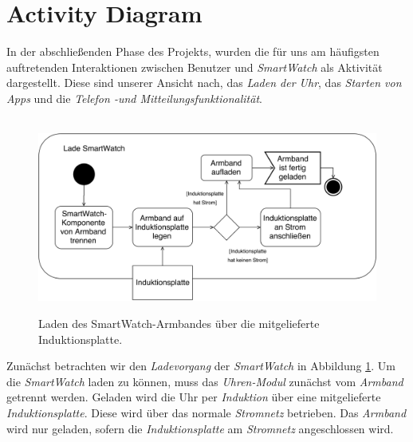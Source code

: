\section{Activity Diagram}
In der abschließenden Phase des Projekts, wurden die für uns am häufigsten auftretenden Interaktionen zwischen Benutzer und \textit{SmartWatch} als Aktivität dargestellt. Diese sind unserer Ansicht nach, das \textit{Laden der Uhr}, das \textit{Starten von Apps} und die \textit{Telefon -und Mitteilungsfunktionalität}.\\
\begin{figure}[h]
\centering\
\includegraphics[width=\textwidth]{img/activityLaden}
\caption{Laden des SmartWatch-Armbandes über die mitgelieferte Induktionsplatte.}\label{fig:activityLaden}
\end{figure}
Zunächst betrachten wir den \textit{Ladevorgang} der \textit{SmartWatch} in Abbildung \ref{fig:activityLaden}.
Um die \textit{SmartWatch} laden zu können, muss das \textit{Uhren-Modul} zunächst vom \textit{Armband} getrennt werden. Geladen wird die Uhr per \textit{Induktion} über eine mitgelieferte \textit{Induktionsplatte}. Diese wird über das normale \textit{Stromnetz} betrieben. Das \textit{Armband} wird nur geladen, sofern die \textit{Induktionsplatte} am \textit{Stromnetz} angeschlossen wird.  \\
